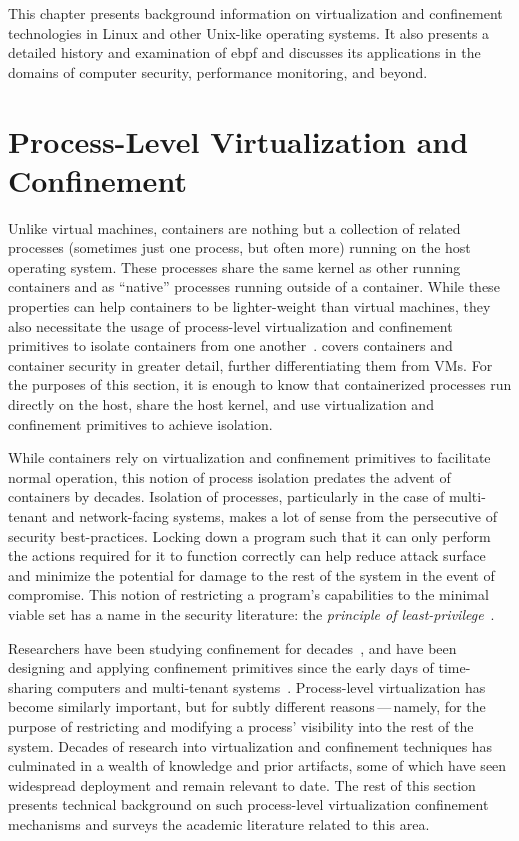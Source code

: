 This chapter presents background information on virtualization and confinement
technologies in Linux and other Unix-like operating systems. It also presents a detailed
history and examination of \gls{ebpf} and discusses its applications in the domains of computer
security, performance monitoring, and beyond.

\section{Process-Level Virtualization and Confinement}%
\label{s:virtualization-and-confinement}

Unlike virtual machines, containers are nothing but a collection of related processes
(sometimes just one process, but often more) running on the host operating system. These
processes share the same kernel as other running containers and as \enquote{native}
processes running outside of a container. While these properties can help containers to be
lighter-weight than virtual machines, they also necessitate the usage of process-level
virtualization and confinement primitives to isolate containers from one
another~\cite{sultan2019_container_security}.   covers
containers and container security in greater detail, further differentiating them from
VMs. For the purposes of this section, it is enough to know that containerized processes
run directly on the host, share the host kernel, and use virtualization and confinement
primitives to achieve isolation.

While containers rely on virtualization and confinement primitives to facilitate normal
operation, this notion of process isolation predates the advent of containers by decades.
Isolation of processes, particularly in the case of multi-tenant and network-facing
systems, makes a lot of sense from the persecutive of security best-practices. Locking
down a program such that it can only perform the actions required for it to function
correctly can help reduce attack surface and minimize the potential for damage to the rest
of the system in the event of compromise. This notion of restricting a program's
capabilities to the minimal viable set has a name in the security literature: the
\textit{principle of least-privilege}~\cite{schneider03_least_privilege,
van_oorschot2020_tools_jewels}.

Researchers have been studying confinement for decades~\cite{lampson1973_confinement}, and
have been designing and applying confinement primitives since the early days of
time-sharing computers and multi-tenant systems~\cite{shu2016_security_isolation_study}.
Process-level virtualization has become similarly important, but for subtly different
reasons\,---\,namely, for the purpose of restricting and modifying a process' visibility
into the rest of the system.  Decades of research into virtualization and confinement
techniques has culminated in a wealth of knowledge and prior artifacts, some of which have
seen widespread deployment and remain relevant to date. The rest of this section presents
technical background on such process-level virtualization confinement mechanisms and
surveys the academic literature related to this area.

